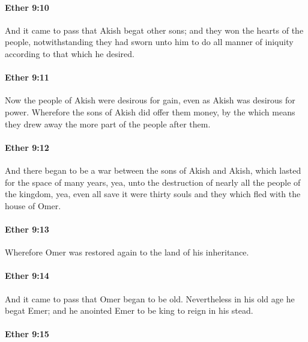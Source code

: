 		\paragraph{Ether 9:10} %
			\label{ETHER-9-10}

			And it came to pass that Akish begat other sons;
			and they won the hearts of the people,
			notwithstanding they had sworn unto him
			to do all manner of iniquity according to that which he desired.

		\paragraph{Ether 9:11} %
			\label{ETHER-9-11}

			Now the people of Akish were desirous for gain,
			even as Akish was desirous for power.
			Wherefore the sons of Akish did offer them money,
			by the which means they drew away the more part of the people after them.

		\paragraph{Ether 9:12} %
			\label{ETHER-9-12}

			And there began to be a war between the sons of Akish and Akish,
			which lasted for the space of many years,
			yea, unto the destruction of nearly all the people of the kingdom,
			yea, even all save it were thirty souls
			and they which fled with the house of Omer.

		\paragraph{Ether 9:13} %
			\label{ETHER-9-13}

			Wherefore Omer was restored again to the land of his inheritance.

		\paragraph{Ether 9:14} %
			\label{ETHER-9-14}

			And it came to pass that Omer began to be old.
			Nevertheless in his old age he begat Emer;
			and he anointed Emer to be king to reign in his stead.

		\paragraph{Ether 9:15} %
			\label{ETHER-9-15}

